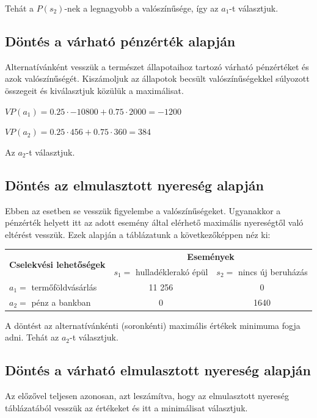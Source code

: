 \documentclass[a4paper,12pt]{article}
\begin{document}
Tehát a $P(s_2)$-nek a legnagyobb a valószínűsége, így az $a_1$-t választjuk.

\subsection{Döntés a várható pénzérték alapján}
\label{VP}
Alternatívánként vesszük a természet állapotaihoz tartozó várható pénzértéket és azok valószínűségét. Kiszámoljuk az állapotok becsült valószínűségekkel súlyozott összegeit és kiválasztjuk közülük a maximálisat.

$VP(a_1) = 0.25\cdot -10800 + 0.75\cdot 2000 = -1200$

$VP(a_2) = 0.25\cdot 456 + 0.75\cdot 360 = 384$

Az $a_2$-t választjuk.

\subsection{Döntés az elmulasztott nyereség alapján}
\label{susec:elmunyer}
Ebben az esetben se vesszük figyelembe a valószínűségeket. Ugyanakkor a pénzérték helyett itt az adott esemény által elérhető maximális nyereségtől való eltérést vesszük. Ezek alapján a táblázatunk a következőképpen néz ki:

\begin{center}
\begin{tabular}{l|c|c}
\multirow{2}{*}{\bf Cselekvési lehetőségek } &  \multicolumn{2}{c}{ \bf Események }\\

 & $s_1=$ hulladéklerakó épül & $s_2=$ nincs új beruházás \\
\hline
  $a_1=$ termőföldvásárlás  & 11 256 & 0 \\
  $a_2=$ pénz a bankban & 0 & 1640\\
\end{tabular}
\end{center}

A döntést az alternatívánkénti (soronkénti) maximális értékek minimuma fogja adni. Tehát az $a_2$-t választjuk.

\subsection{Döntés a várható elmulasztott nyereség alapján}
Az előzővel teljesen azonosan, azt leszámítva, hogy az elmulasztott nyereség táblázatából vesszük az értékeket és itt a minimálisat választjuk.
\end{document}
